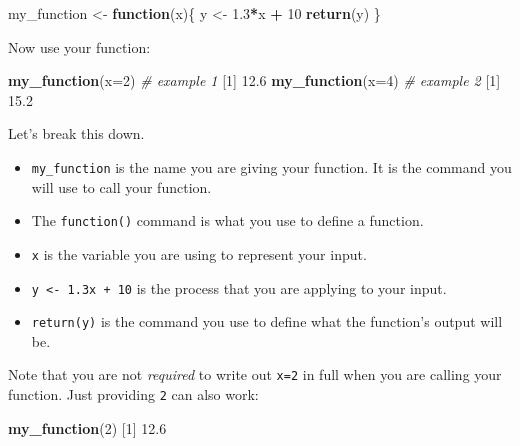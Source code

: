 \documentclass[
]{book}
\newenvironment{Shaded}{\begin{snugshade}}{\end{snugshade}}
\newcommand{\CommentTok}[1]{\textcolor[rgb]{0.56,0.35,0.01}{\textit{#1}}}
\newcommand{\ControlFlowTok}[1]{\textcolor[rgb]{0.13,0.29,0.53}{\textbf{#1}}}
\newcommand{\DataTypeTok}[1]{\textcolor[rgb]{0.13,0.29,0.53}{#1}}
\newcommand{\DecValTok}[1]{\textcolor[rgb]{0.00,0.00,0.81}{#1}}
\newcommand{\FloatTok}[1]{\textcolor[rgb]{0.00,0.00,0.81}{#1}}
\newcommand{\KeywordTok}[1]{\textcolor[rgb]{0.13,0.29,0.53}{\textbf{#1}}}
\newcommand{\NormalTok}[1]{#1}
\newcommand{\OperatorTok}[1]{\textcolor[rgb]{0.81,0.36,0.00}{\textbf{#1}}}
\newcommand{\StringTok}[1]{\textcolor[rgb]{0.31,0.60,0.02}{#1}}
\providecommand{\tightlist}{%
  \setlength{\itemsep}{0pt}\setlength{\parskip}{0pt}}
\begin{document}
\begin{Shaded}
\begin{Highlighting}[]
\NormalTok{my_function <-}\StringTok{ }\ControlFlowTok{function}\NormalTok{(x)\{}
\NormalTok{  y <-}\StringTok{ }\FloatTok{1.3}\OperatorTok{*}\NormalTok{x }\OperatorTok{+}\StringTok{ }\DecValTok{10}
  \KeywordTok{return}\NormalTok{(y)}
\NormalTok{\}}
\end{Highlighting}
\end{Shaded}

Now use your function:

\begin{Shaded}
\begin{Highlighting}[]
\KeywordTok{my_function}\NormalTok{(}\DataTypeTok{x=}\DecValTok{2}\NormalTok{) }\CommentTok{# example 1}
\NormalTok{[}\DecValTok{1}\NormalTok{] }\FloatTok{12.6}
\KeywordTok{my_function}\NormalTok{(}\DataTypeTok{x=}\DecValTok{4}\NormalTok{) }\CommentTok{# example 2}
\NormalTok{[}\DecValTok{1}\NormalTok{] }\FloatTok{15.2}
\end{Highlighting}
\end{Shaded}

Let's break this down.

\begin{itemize}
\tightlist
\item
  \texttt{my\_function} is the name you are giving your function. It is the command you will use to call your function.
\item
  The \texttt{function()} command is what you use to define a function.
\item
  \texttt{x} is the variable you are using to represent your input.
\item
  \texttt{y\ \textless{}-\ 1.3x\ +\ 10} is the process that you are applying to your input.
\item
  \texttt{return(y)} is the command you use to define what the function's output will be.
\end{itemize}

Note that you are not \emph{required} to write out \texttt{x=2} in full when you are calling your function. Just providing \texttt{2} can also work:

\begin{Shaded}
\begin{Highlighting}[]
\KeywordTok{my_function}\NormalTok{(}\DecValTok{2}\NormalTok{)}
\NormalTok{[}\DecValTok{1}\NormalTok{] }\FloatTok{12.6}
\end{Highlighting}
\end{Shaded}
\end{document}
